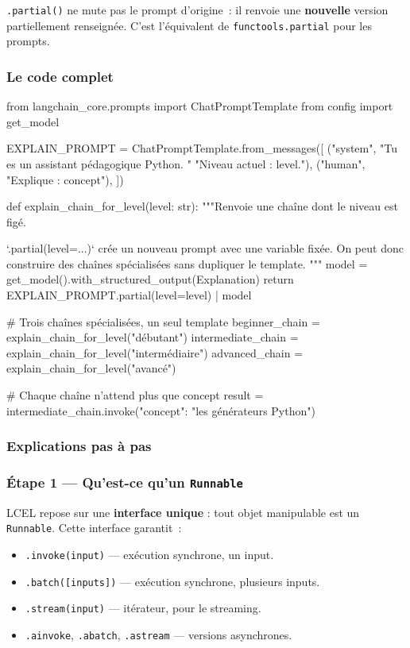 \documentclass[11pt,a4paper]{article}
\begin{document}
\texttt{.partial()} ne mute pas le prompt d'origine~: il renvoie une
\textbf{nouvelle} version partiellement renseignée. C'est l'équivalent de
\texttt{functools.partial} pour les prompts.

\subsubsection{Le code complet}

\begin{pythoncode}
from langchain_core.prompts import ChatPromptTemplate
from config import get_model

EXPLAIN_PROMPT = ChatPromptTemplate.from_messages([
    ("system", "Tu es un assistant pédagogique Python. "
               "Niveau actuel : {level}."),
    ("human",  "Explique : {concept}"),
])

def explain_chain_for_level(level: str):
    """Renvoie une chaîne dont le niveau est figé.

    `.partial(level=...)` crée un nouveau prompt avec une variable fixée.
    On peut donc construire des chaînes spécialisées sans dupliquer le template.
    """
    model = get_model().with_structured_output(Explanation)
    return EXPLAIN_PROMPT.partial(level=level) | model


# Trois chaînes spécialisées, un seul template
beginner_chain     = explain_chain_for_level("débutant")
intermediate_chain = explain_chain_for_level("intermédiaire")
advanced_chain     = explain_chain_for_level("avancé")

# Chaque chaîne n'attend plus que {concept}
result = intermediate_chain.invoke({"concept": "les générateurs Python"})
\end{pythoncode}

\subsubsection{Explications pas à pas}

\subsubsection*{Étape 1 — Qu'est-ce qu'un \texttt{Runnable}}

LCEL repose sur une \textbf{interface unique} : tout objet manipulable est
un \texttt{Runnable}. Cette interface garantit~:

\begin{itemize}[leftmargin=*]
  \item \texttt{.invoke(input)} — exécution synchrone, un input.
  \item \texttt{.batch([inputs])} — exécution synchrone, plusieurs inputs.
  \item \texttt{.stream(input)} — itérateur, pour le streaming.
  \item \texttt{.ainvoke}, \texttt{.abatch}, \texttt{.astream} — versions
        asynchrones.
\end{itemize}
\end{document}
